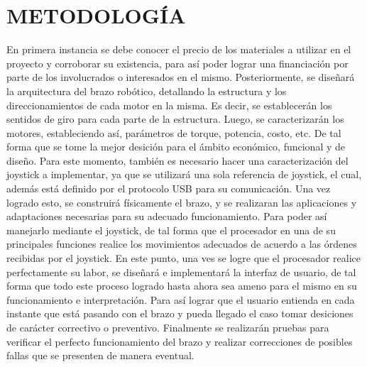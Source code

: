 \documentclass[10pt,graphicx,caption,rotating]{article}
\begin{document}
\section{METODOLOGÍA}
\noindent
En primera instancia se debe conocer el precio de los materiales a utilizar en el proyecto y corroborar su existencia, para así poder lograr una financiación por parte de los involucrados o interesados en el mismo. Posteriormente, se diseñará la arquitectura del brazo robótico, detallando la estructura y los direccionamientos de cada motor en la misma. Es decir, se establecerán los sentidos de giro para cada parte de la estructura. Luego, se caracterizarán los motores, estableciendo así, parámetros de torque, potencia, costo, etc. De tal forma que se tome la mejor desición para el ámbito económico, funcional y de diseño. Para este momento, también es necesario hacer una caracterización del joystick a implementar, ya que se utilizará una sola referencia de joystick, el cual, además está definido por el protocolo USB para su comunicación. Una vez logrado esto, se construirá físicamente el brazo, y se realizaran las aplicaciones y adaptaciones necesarias para su adecuado funcionamiento. Para poder así manejarlo mediante el joystick, de tal forma que el procesador en una de su principales funciones realice los movimientos adecuados de acuerdo a las órdenes recibidas por el joystick. En este punto, una ves se logre que el procesador realice perfectamente su labor, se diseñará e implementará la interfaz de usuario, de tal forma que todo este proceso logrado hasta ahora sea ameno para el mismo en su funcionamiento e interpretación. Para así lograr que el usuario entienda en cada instante que está pasando con el brazo y pueda llegado el caso tomar desiciones de carácter correctivo o preventivo. Finalmente se realizarán pruebas para verificar el perfecto funcionamiento del brazo y realizar correcciones de posibles fallas que se presenten de manera eventual.
\end{document}
